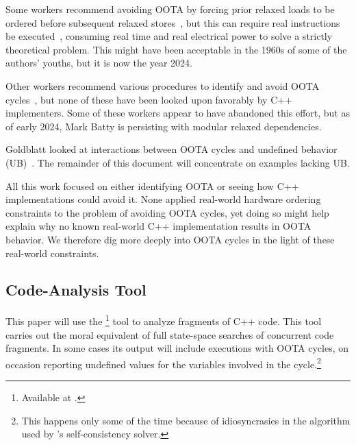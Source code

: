 \documentclass[10]{article}
\begin{document}
Some workers recommend avoiding OOTA by forcing prior relaxed
loads to be ordered before subsequent relaxed
stores~\cite{Boehm:2014:OGA:2618128.2618134,HansBoehm2019OOTArevisitedAgain,Lahav:2017:RSC:3062341.3062352},
but this can require real instructions be
executed~\cite[Section 7.1]{Maranget2012TutorialARMPower},
consuming real time and real electrical power to solve a strictly
theoretical problem.
This might have been acceptable in the 1960s of some of the authors'
youths, but it is now the year 2024.

Other workers recommend various procedures to identify and avoid OOTA
cycles~\cite{Lahav:2017:RSC:3062341.3062352,Sinclair:2017:CAR:3079856.3080206,Lee:10.1145/3385412.3386010,MarkBatty2019ModularRelaxedDependenciesOOTA},
but none of these have been looked upon favorably by C++ implementers.
Some of these workers appear to have abandoned this effort, but as of
early 2024, Mark Batty is persisting with modular relaxed dependencies.

Goldblatt looked at interactions between OOTA cycles and
undefined behavior (UB)~\cite{DavidGoldblatt2019NoElegantOOTAfix}.
The remainder of this document will concentrate on examples lacking UB.

All this work focused on either identifying OOTA or seeing how C++
implementations could avoid it.
None applied real-world hardware ordering constraints to the problem
of avoiding OOTA cycles,
yet doing so might help explain why no known real-world C++ implementation
results in OOTA behavior.
We therefore dig more deeply into OOTA cycles in the light
of these real-world constraints.

\subsection{Code-Analysis Tool}
\label{sec:Code-Analysis Tool}

This paper will use the \footnote{
	Available at .}
tool to analyze fragments of C++ code.
This tool carries out the moral equivalent of full state-space searches
of concurrent code fragments.
In some cases its output will include executions with OOTA cycles,
on occasion reporting undefined values for the variables involved in
the cycle.\footnote{
	This happens only some of the time because of idiosyncrasies
	in the algorithm used by 's self-consistency solver.}
\end{document}
